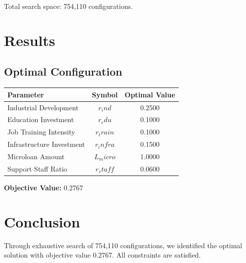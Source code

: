 \documentclass[11pt,a4paper]{article}
\begin{document}
Total search space: 754,110 configurations.

\section{Results}

\subsection{Optimal Configuration}

\begin{center}
\begin{tabular}{|l|c|c|}
\hline
Parameter & Symbol & Optimal Value \\
\hline
Industrial Development & $r_ind$ & 0.2500 \\
Education Investment & $r_edu$ & 0.1000 \\
Job Training Intensity & $r_train$ & 0.1000 \\
Infrastructure Investment & $r_infra$ & 0.1500 \\
Microloan Amount & $L_micro$ & 1.0000 \\
Support Staff Ratio & $r_staff$ & 0.0600 \\
\hline
\end{tabular}
\end{center}

\textbf{Objective Value:} 0.2767

\section{Conclusion}

Through exhaustive search of 754,110 configurations, we identified the optimal solution with objective value 0.2767. All constraints are satisfied.
\end{document}
